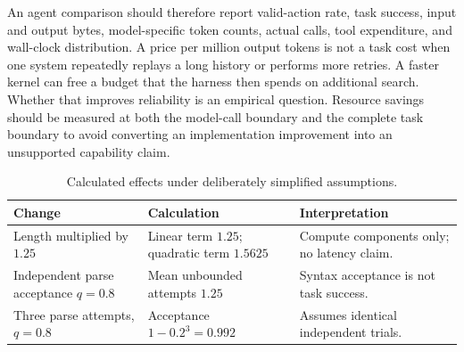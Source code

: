An agent comparison should therefore report valid-action rate, task success, input and output bytes, model-specific token counts, actual calls, tool expenditure, and wall-clock distribution. A price per million output tokens is not a task cost when one system repeatedly replays a long history or performs more retries. A faster kernel can free a budget that the harness then spends on additional search. Whether that improves reliability is an empirical question. Resource savings should be measured at both the model-call boundary and the complete task boundary to avoid converting an implementation improvement into an unsupported capability claim.

{\small\setlength{\tabcolsep}{3pt}
\begin{table}[!htbp]
\centering
\caption{Calculated effects under deliberately simplified assumptions.}\label{tab:C03:arithmetic}
\begin{tabular}{L{31mm}L{34mm}L{41mm}}

\toprule Change & Calculation & Interpretation\\\midrule
Length multiplied by $1.25$ & Linear term $1.25$; quadratic term $1.5625$ & Compute components only; no latency claim.\\
Independent parse acceptance $q=0.8$ & Mean unbounded attempts $1.25$ & Syntax acceptance is not task success.\\
Three parse attempts, $q=0.8$ & Acceptance $1-0.2^3=0.992$ & Assumes identical independent trials.\\
\bottomrule
\end{tabular}
\end{table}
}
